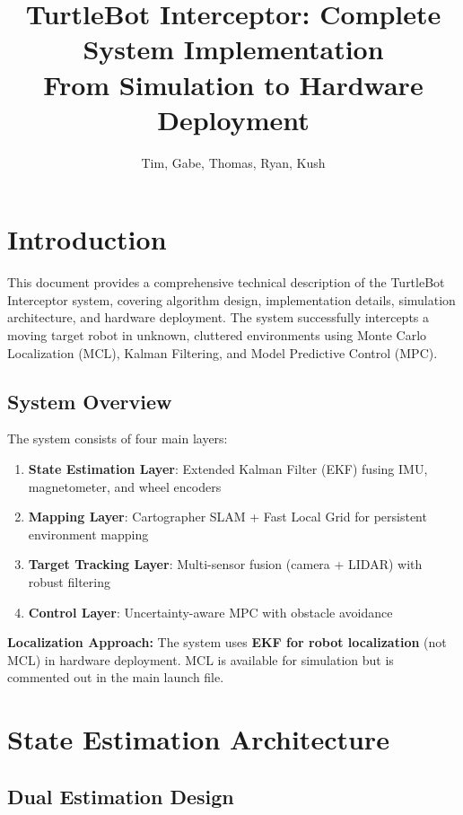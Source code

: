 \documentclass[11pt]{article}
\title{TurtleBot Interceptor: Complete System Implementation\\
\large From Simulation to Hardware Deployment}
\author{Tim, Gabe, Thomas, Ryan, Kush}
\date{}
\begin{document}
\maketitle

\tableofcontents
\newpage

\section{Introduction}

This document provides a comprehensive technical description of the TurtleBot Interceptor system, covering algorithm design, implementation details, simulation architecture, and hardware deployment. The system successfully intercepts a moving target robot in unknown, cluttered environments using Monte Carlo Localization (MCL), Kalman Filtering, and Model Predictive Control (MPC).

\subsection{System Overview}

The system consists of four main layers:

\begin{enumerate}
    \item \textbf{State Estimation Layer}: Extended Kalman Filter (EKF) fusing IMU, magnetometer, and wheel encoders
    \item \textbf{Mapping Layer}: Cartographer SLAM + Fast Local Grid for persistent environment mapping
    \item \textbf{Target Tracking Layer}: Multi-sensor fusion (camera + LIDAR) with robust filtering
    \item \textbf{Control Layer}: Uncertainty-aware MPC with obstacle avoidance
\end{enumerate}

\textbf{Localization Approach:} The system uses \textbf{EKF for robot localization} (not MCL) in hardware deployment. MCL is available for simulation but is commented out in the main launch file.

\section{State Estimation Architecture}

\subsection{Dual Estimation Design}
\end{document}
